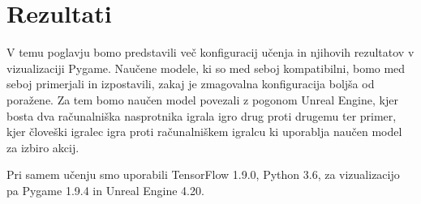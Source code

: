 \documentclass[a4paper, 12pt]{book}
\begin{document}
\chapter{Rezultati}
\label{chrezultati}

V temu poglavju bomo predstavili več konfiguracij učenja in njihovih rezultatov v vizualizaciji Pygame.
Naučene modele, ki so med seboj kompatibilni, bomo med seboj primerjali in izpostavili, zakaj je zmagovalna konfiguracija boljša od poražene.
Za tem bomo naučen model povezali z pogonom Unreal Engine, kjer bosta dva računalniška nasprotnika igrala igro drug proti drugemu ter primer, kjer človeški igralec igra proti računalniškem igralcu ki uporablja naučen model za izbiro akcij.

Pri samem učenju smo uporabili  TensorFlow 1.9.0, Python 3.6, za vizualizacijo pa  Pygame 1.9.4 in Unreal Engine 4.20.
\end{document}
